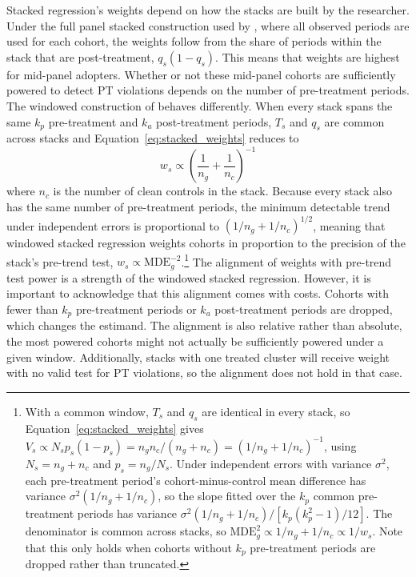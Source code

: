 \documentclass[12pt]{article}
\begin{document}
Stacked regression's weights depend on how the stacks are built by the researcher. Under the full panel stacked construction used by \textcite{payson2025residency}, where all observed periods are used for each cohort, the weights follow from the share of periods within the stack that are post-treatment, $q_s(1-q_s)$. This means that weights are highest for mid-panel adopters. Whether or not these mid-panel cohorts are sufficiently powered to detect PT violations depends on the number of pre-treatment periods. The windowed construction of \textcite{cengiz2019effect} behaves differently. When every stack spans the same $k_p$ pre-treatment and $k_a$ post-treatment periods, $T_s$ and $q_s$ are common across stacks and Equation~\ref{eq:stacked_weights} reduces to
\begin{equation}\label{eq:stacked_window}
    w_s \propto \left(\frac{1}{n_g} + \frac{1}{n_c}\right)^{-1}
\end{equation}
where $n_c$ is the number of clean controls in the stack. Because every stack also has the same number of pre-treatment periods, the minimum detectable trend under independent errors is proportional to $(1/n_g + 1/n_c)^{1/2}$, meaning that windowed stacked regression weights cohorts in proportion to the precision of the stack's pre-trend test, $w_s \propto \text{MDE}_g^{-2}$.\footnote{With a common window, $T_s$ and $q_s$ are identical in every stack, so Equation~\ref{eq:stacked_weights} gives $V_s \propto N_s p_s (1-p_s) = n_g n_c / (n_g + n_c) = (1/n_g + 1/n_c)^{-1}$, using $N_s = n_g + n_c$ and $p_s = n_g / N_s$. Under independent errors with variance $\sigma^2$, each pre-treatment period's cohort-minus-control mean difference has variance $\sigma^2(1/n_g + 1/n_c)$, so the slope fitted over the $k_p$ common pre-treatment periods has variance $\sigma^2 (1/n_g + 1/n_c) / [k_p(k_p^2 - 1)/12]$. The denominator is common across stacks, so $\text{MDE}_g^2 \propto 1/n_g + 1/n_c \propto 1/w_s$. Note that this only holds when cohorts without $k_p$ pre-treatment periods are dropped rather than truncated.} The alignment of weights with pre-trend test power is a strength of the windowed stacked regression. However, it is important to acknowledge that this alignment comes with costs. Cohorts with fewer than $k_p$ pre-treatment periods or $k_a$ post-treatment periods are dropped, which changes the estimand. The alignment is also relative rather than absolute, the most powered cohorts might not actually be sufficiently powered under a given window. Additionally, stacks with one treated cluster will receive weight with no valid test for PT violations, so the alignment does not hold in that case.
\end{document}
